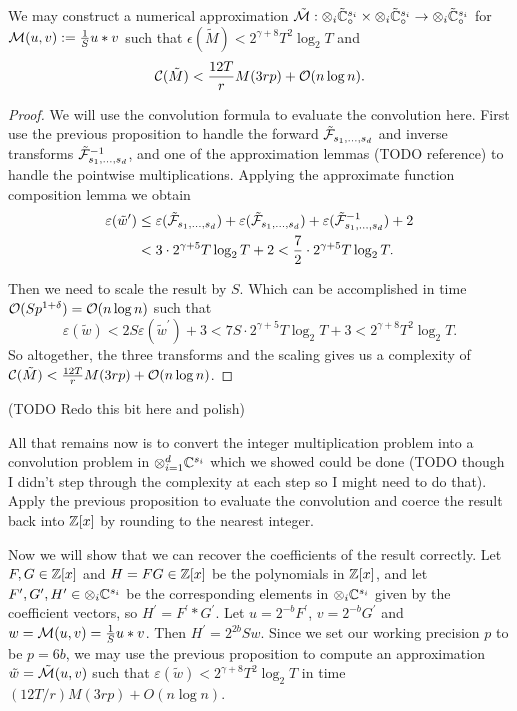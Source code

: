 \begin{proposition}
    We may construct a numerical approximation $\tilde{\mathcal M}: \otimes_i \tilde{{\mathbb C}}_\circ^{s_i} \times \otimes_i \tilde{{\mathbb C}}_\circ^{s_i} \to \otimes_i \tilde{{\mathbb C}}_\circ^{s_i}$ for $\mathcal M(u, v) := \frac{1}{S}u \ast v$ such that $\epsilon(\tilde{M}) < 2^{\gamma + 8}T^2 \log_2T$ and
    \[
        \mathcal C(\tilde{M}) < \frac{12T}{r} M(3rp) + \mathcal O(n \log n).
    \]
\end{proposition}

\begin{proof}
    We will use the convolution formula to evaluate the convolution here. First use the previous proposition to handle the forward $\tilde{\mathcal F}_{s_1, \ldots, s_d}$ and inverse transforms $\tilde{\mathcal F}_{s_1, \ldots, s_d}^{-1}$, and one of the approximation lemmas (TODO reference) to handle the pointwise multiplications. Applying the approximate function composition lemma we obtain
    \begin{align*}
        \varepsilon(\tilde{w}^\prime) &\leq \varepsilon(\tilde{\mathcal F}_{s_1, \ldots, s_d}) + \varepsilon(\tilde{\mathcal F}_{s_1, \ldots, s_d}) + \varepsilon(\tilde{\mathcal F}^{-1}_{s_1, \ldots, s_d}) + 2\\
                                      &< 3 \cdot 2^{\gamma + 5}T\log_2 T + 2 < \frac{7}{2} \cdot 2^{\gamma + 5}T \log_2 T.
    \end{align*}

    Then we need to scale the result by $S$. Which can be accomplished in time $\mathcal O(Sp^{1 + \delta}) = \mathcal O(n \log n)$ such that
    \[
        \varepsilon(\tilde{w}) < 2S\varepsilon(\tilde{w}^\prime) + 3 < 7S \cdot 2^{\gamma + 5} T \log_2 T + 3 < 2^{\gamma + 8}T^2 \log_2 T.
    \]
    So altogether, the three transforms and the scaling gives us a complexity of $\mathcal C(\tilde{M}) < \frac{12T}{r} M(3rp) + \mathcal O(n \log n)$.
\end{proof}


(TODO Redo this bit here and polish)

All that remains now is to convert the integer multiplication problem into a convolution problem in $\otimes_{i=1}^d {\mathbb C}^{s_i}$ which we showed could be done (TODO though I didn't step through the complexity at each step so I might need to do that). Apply the previous proposition to evaluate the convolution and coerce the result back into ${\mathbb Z}[x]$ by rounding to the nearest integer.

Now we will show that we can recover the coefficients of the result correctly.
Let $F, G \in {\mathbb Z}[x]$ and $H = FG \in {\mathbb Z}[x]$ be the polynomials in ${\mathbb Z}[x]$, and let $F^\prime, G^\prime, H^\prime \in \otimes_i {\mathbb C}^{s_i}$ be the corresponding elements in $\otimes_i {\mathbb C}^{s_i}$ given by the coefficient vectors, so $H^\prime = F^\prime \ast G^\prime$. Let $u = 2^{-b}F^\prime$, $v = 2^{-b} G^\prime$ and $w = \mathcal M(u, v) = \frac{1}{S} u \ast v$. Then $H^\prime = 2^{2b}Sw$. Since we set our working precision $p$ to be $p = 6b$, we may use the previous proposition to compute an approximation $\tilde{w} = \tilde{\mathcal M}(u, v)$ such that $\varepsilon(\tilde{w}) < 2^{\gamma + 8} T^2 \log_2 T$ in time $(12T/r)M(3rp) + O(n \log n)$.

